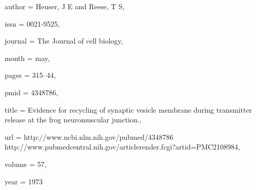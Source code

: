 {author = {Heuser, J E and Reese, T S},

issn = {0021-9525},

journal = {The Journal of cell biology},

month = {may},

pages = {315--44},

pmid = {4348786},

title = {{Evidence for recycling of synaptic vesicle membrane during transmitter release at the frog neuromuscular junction.}},

url = {http://www.ncbi.nlm.nih.gov/pubmed/4348786 http://www.pubmedcentral.nih.gov/articlerender.fcgi?artid=PMC2108984},

volume = {57},

year = {1973}

}

